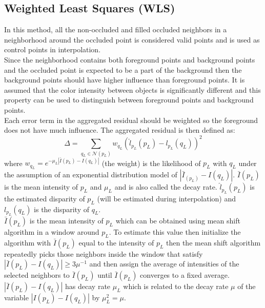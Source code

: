 \subsection{Weighted Least Squares (WLS)}
In this method, all the non-occluded and filled occluded neighbors in a neighborhood around the occluded point is considered valid points and is used as control points in interpolation.\\

Since the neighborhood contains both foreground points and background points and the occluded point is expected to be a part of the background then the background points should have higher influence than foreground points. It is assumed that the color intensity between objects is significantly different and this property can be used to distinguish between foreground points and background points. \\

Each error term in the aggregated residual should be weighted so the foreground does not have much influence. The aggregated residual is then defined as:
\begin{equation}
  \Delta = \sum_{q_L \in \mathcal{N}(p_L)} w_{q_L} (\hat{l}_{p_L}(p_L)-l_{p_L}(q_L))^2
\end{equation}
where $w_{q_L} = e^{-\mu_L | \bar{I}(p_L) - I(q_L)|}$ (the weight) is the likelihood of $p_L$ with $q_L$ under the assumption of an exponential distribution model of $| \bar{I}_(p_L)- I(q_L) |$. $\bar{I}(p_L)$ is the mean intensity of $p_L$ and $\mu_L$ and is also called the decay rate. $\hat{l}_{p_L}(p_L)$ is the estimated disparity of $p_L$ (will be estimated during interpolation) and $l_{p_L}(q_L)$ is the disparity of $q_L$. \\

$\bar{I}(p_L)$ is the mean intensity of $p_L$ which can be obtained using mean shift algorithm in a window around $p_L$. To estimate this value then initialize the algorithm with $\bar{I}(p_L) $ equal to the intensity of $p_L$ then the mean shift algorithm repeatedly picks those neighbors inside the window that satisfy $| \bar{I}(p_L) - I (q_L) | \geq 3\mu^{-1}$ and then assign the average of intensities of the selected neighbors to $\bar{I}(p_L)$ until $\bar{I}(p_L)$ converges to a fixed average. $|\bar{I}(p_L) - I(q_L)|$ has decay rate $\mu_L$ which is related to the decay rate $\mu$ of the variable $|I(p_L) - I(q_L)|$ by $\mu_L^2 = \mu$.\\

